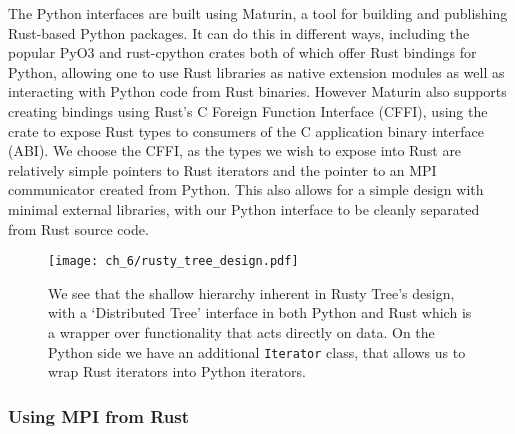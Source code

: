 The Python interfaces are built using Maturin, a tool for building and publishing Rust-based Python packages. It can do this in different ways, including the popular PyO3 \cite{pyo32022github} and rust-cpython \cite{rustcpython2022github} crates both of which offer Rust bindings for Python, allowing one to use Rust libraries as native extension modules as well as interacting with Python code from Rust binaries. However Maturin also supports creating bindings using Rust's C Foreign Function Interface (CFFI), using the  crate to expose Rust types to consumers of the C application binary interface (ABI). We choose the CFFI, as the types we wish to expose into Rust are relatively simple pointers to Rust iterators and the pointer to an MPI communicator created from Python. This also allows for a simple design with minimal external libraries, with our Python interface to be cleanly separated from Rust source code.



\begin{figure}
    \centerline{\texttt{[image: ch\_6/rusty\_tree\_design.pdf]}}
    \caption{We see that the shallow hierarchy inherent in Rusty Tree's design, with a `Distributed Tree' interface in both Python and Rust which is a wrapper over functionality that acts directly on data. On the Python side we have an additional \texttt{Iterator} class, that allows us to wrap Rust iterators into Python iterators.}
    \label{fig:sec_2_4:design}
\end{figure}

\subsubsection*{Using MPI from Rust}


